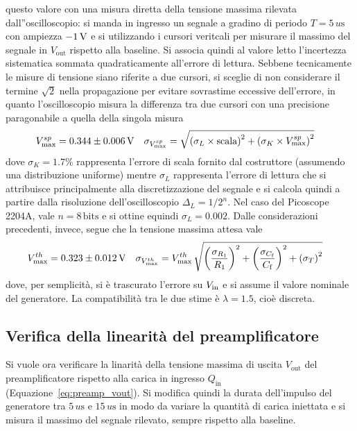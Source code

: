 questo valore con una misura diretta della tensione massima rilevata
dall''oscilloscopio: si manda in ingresso un segnale a gradino di periodo
$T=5\,\si{u\s}$ con ampiezza $-1\,\si{\volt}$ e si utilizzando i cursori veritcali per
misurare il massimo del segnale in $V_{\text{out}}$ rispetto alla baseline.
Si associa quindi al valore letto l'incertezza sistematica sommata
quadraticamente all'errore di lettura. Sebbene tecnicamente le misure di tensione
siano riferite a due cursori, si sceglie di non considerare il termine $\sqrt 2$ nella
propagazione per evitare sovrastime eccessive dell'errore, in quanto l'oscilloscopio misura
la differenza tra due cursori con una precisione paragonabile a quella della singola misura
\begin{align}\label{eq:v_osc_err}
  V_{\text{max}}^{sp}&=0.344 \pm 0.006 \,\si{\volt}
  &
  \sigma_{V_{\text{max}}^{sp}}&=\sqrt{ {\left(\sigma_{L}\times \text{scala}\right)}^{2}+
  {\left(\sigma_{K}\times V_{\text{max}}^{sp}\right)}^{2}}
\end{align}
dove $\sigma_{K}=1.7\%$ rappresenta l'errore di scala fornito dal costruttore (assumendo una distribuzione uniforme) mentre $\sigma_{L}$ rappresenta l'errore di lettura che si attribuisce principalmente alla discretizzazione del segnale e si calcola quindi a partire dalla risoluzione
dell'oscilloscopio $\Delta_{L}= 1/2^{n}$. Nel caso del Picoscope 2204A, vale $n=8\,\text{bits}$ e si ottine equindi $\sigma_{L}=0.002$.
Dalle considerazioni precedenti, invece, segue che la tensione massima attesa vale
\begin{align}
  V_{\text{max}}^{th}&=0.323 \pm 0.012 \,\si{\volt}
  &
  \sigma_{V_{\text{max}}^{th}}&=V_{\text{max}}^{th}\,\sqrt{ {\left(\frac{\sigma_{R_{1}}}
                {R_{1}}\right)}^{2}+
 {\left(\frac{\sigma_{C_{\text{f}}}}
                {C_{\text f}}\right)}^{2}+
  {\left(\sigma_{T}\right)}^{2}}
\end{align}
dove, per semplicità, si è trascurato l'errore su $V_{\text{in}}$ e si assume il valore nominale del generatore. La compatibilità tra le due stime è $\lambda=1.5$, cioè discreta.

\subsection{Verifica della linearità del preamplificatore}\label{sec:preamp_lin}
Si vuole ora verificare la linarità della tensione massima di uscita $V_{\text{out}}$ del preamplificatore
rispetto alla carica in ingresso $Q_{\text{in}}$ (Equazione~\ref{eq:preamp_vout}).
Si modifica quindi la durata dell'impulso del generatore tra $5\,\si{u\s}$ e
$15\,\si{u\s}$ in modo da variare la
quantità di carica iniettata e si misura il massimo del segnale rilevato, sempre
rispetto alla baseline.

